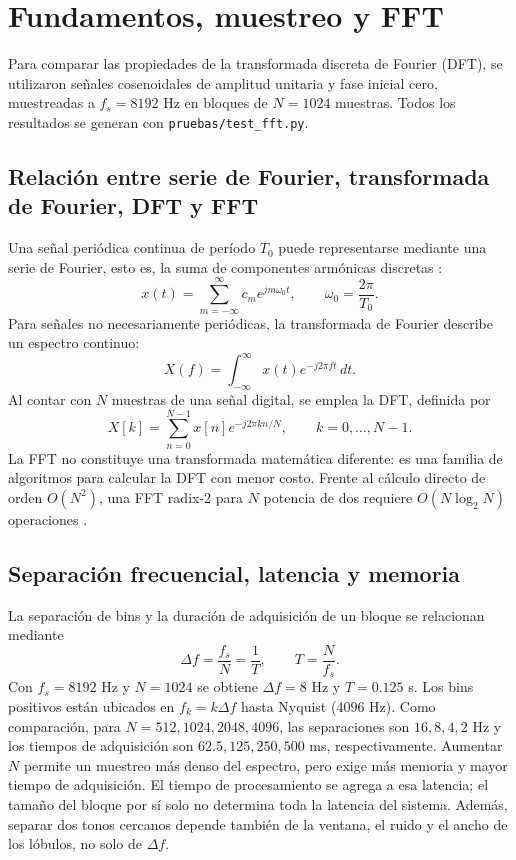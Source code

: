 \section{Fundamentos, muestreo y FFT}\label{sec:fundamentos}
Para comparar las propiedades de la transformada discreta de Fourier (DFT), se utilizaron señales cosenoidales de amplitud unitaria y fase inicial cero, muestreadas a $f_s=8192$ Hz en bloques de $N=1024$ muestras. Todos los resultados se generan con \texttt{pruebas/test\_fft.py}.

\subsection{Relación entre serie de Fourier, transformada de Fourier, DFT y FFT}
Una señal periódica continua de período $T_0$ puede representarse mediante una serie de Fourier, esto es, la suma de componentes armónicas discretas \cite{oppenheim2010}:
\begin{equation}
 x(t)=\sum_{m=-\infty}^{\infty}c_m e^{jm\omega_0 t},\qquad \omega_0=\frac{2\pi}{T_0}.
\end{equation}
Para señales no necesariamente periódicas, la transformada de Fourier describe un espectro continuo:
\begin{equation}
 X(f)=\int_{-\infty}^{\infty}x(t)e^{-j2\pi ft}\,dt.
\end{equation}
Al contar con $N$ muestras de una señal digital, se emplea la DFT, definida por
\begin{equation}
 X[k]=\sum_{n=0}^{N-1}x[n]e^{-j2\pi kn/N},\qquad k=0,\dots,N-1.
\end{equation}
La FFT no constituye una transformada matemática diferente: es una familia de algoritmos para calcular la DFT con menor costo. Frente al cálculo directo de orden $O(N^2)$, una FFT radix-2 para $N$ potencia de dos requiere $O(N\log_2 N)$ operaciones \cite{cooley1965}.

\subsection{Separación frecuencial, latencia y memoria}
La separación de bins y la duración de adquisición de un bloque se relacionan mediante
\begin{equation}
 \Delta f=\frac{f_s}{N}=\frac{1}{T},\qquad T=\frac{N}{f_s}.
\end{equation}
Con $f_s=8192$ Hz y $N=1024$ se obtiene $\Delta f=8$ Hz y $T=0.125$ s. Los bins positivos están ubicados en $f_k=k\Delta f$ hasta Nyquist ($4096$ Hz). Como comparación, para $N=512,1024,2048,4096$, las separaciones son $16,8,4,2$ Hz y los tiempos de adquisición son $62.5,125,250,500$ ms, respectivamente. Aumentar $N$ permite un muestreo más denso del espectro, pero exige más memoria y mayor tiempo de adquisición. El tiempo de procesamiento se agrega a esa latencia; el tamaño del bloque por sí solo no determina toda la latencia del sistema. Además, separar dos tonos cercanos depende también de la ventana, el ruido y el ancho de los lóbulos, no solo de $\Delta f$.

